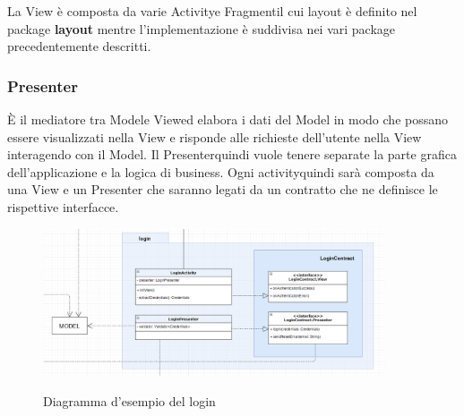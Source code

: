 La View è composta da varie Activity\glosp e Fragment\glosp il cui layout è definito nel package \textbf{layout} mentre l'implementazione è suddivisa nei vari package precedentemente descritti.
\subsubsection{Presenter}
È il mediatore tra Model\glosp e View\glosp ed elabora i dati del Model in modo che possano essere visualizzati nella View e risponde alle richieste dell'utente nella View interagendo con il Model. Il Presenter\glosp quindi vuole tenere separate la parte grafica dell'applicazione e la logica di business.\newline
Ogni activity\glosp quindi sarà composta da una View e un Presenter che saranno legati da un contratto che ne definisce le rispettive interfacce.
\begin{figure}[H]
	\centering
	\includegraphics[width=0.9\textwidth]
	{res/images/contratto.png}\\
	\caption{Diagramma d'esempio del login}
	\label{Schema Login}
\end{figure}
\newpage
